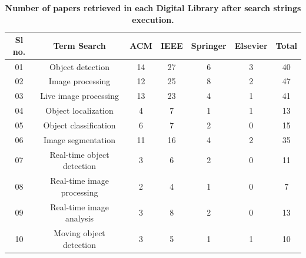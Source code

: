 \documentclass[two column]{ieeeaccess}
\begin{document}
\begin{table}[h]
\begin{center}
\caption{\textbf{Number of papers retrieved in each Digital Library after search strings execution.}}
\begin{tabular}{c|c|c|c|c|c|c}
\hline
        Sl no. &  Term Search & ACM & IEEE & Springer & Elsevier & Total     \\ 
\hline
        01 & Object detection & 14 & 27 & 6 & 3 & 40 \\
        02 & Image processing & 12 & 25 & 8 & 2 & 47 \\
        03 & Live image processing & 13 & 23 & 4 & 1 & 41 \\
        04 & Object localization & 4 & 7 & 1 & 1 & 13 \\
        05 & Object classification & 6 & 7 & 2 & 0 & 15 \\
        06 & Image segmentation & 11 & 16 & 4 & 2 & 35 \\
        07 & Real-time object detection & 3 & 6 & 2 & 0 & 11 \\
        08 & Real-time image processing & 2 & 4 & 1 & 0 & 7 \\
        09 & Real-time image analysis & 3 & 8 & 2 & 0 & 13 \\
        10 & Moving object detection & 3 & 5 & 1 & 1 & 10 \\
\hline
\end{tabular}
\end{center}
\end{table}
\end{document}
